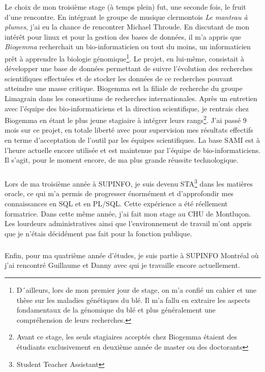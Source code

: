 \documentclass[11pt, a4paper ]{article}
\begin{document}
\begin{spacing}{1.5}
Le choix de mon troisième stage (à temps plein) fut, une seconde fois, le fruit d'une rencontre. En intégrant le groupe de musique clermontois \emph{Le manteau à plumes}, j'ai eu la chance de rencontrer Michael Throude. En discutant de mon intérêt pour linux et pour la gestion des bases de données, il m'a appris que \emph{Biogemma} recherchait un bio-informaticien ou tout du moins, un informaticien prêt à apprendre la biologie génomique\footnote{D´ailleurs, lors de mon premier jour de stage, on m'a confié un cahier et une thèse sur les maladies génétiques du blé. Il m'a fallu en extraire les aspects fondamentaux de la génomique du blé et plus généralement une compréhension de leurs recherches.}. Le projet, en lui-même, consistait à développer une base de données permettant de suivre l'évolution des recherches scientifiques effectuées et de stocker les données de ce recherches pouvant atteindre une masse critique. Biogemma est la filiale de recherche du groupe Limagrain dans les consortiums de recherches internationales. Après un entretien avec l'équipe des bio-informaticiens et la direction scientifique, je rentrais chez Biogemma en étant le plus jeune stagiaire à intégrer leurs rangs\footnote{Avant ce stage, les seuls stagiaires acceptés chez Biogemma étaient des étudiants exclusivement en deuxième année de master ou des doctorants}. J'ai passé 9 mois sur ce projet, en totale liberté avec pour supervision mes résultats effectifs en terme d'acceptation de l’outil par les équipes scientifiques. La base SAMI est à l'heure actuelle encore utilisée et est maintenue par l'équipe de bio-informaticiens. Il s'agit, pour le moment encore, de ma plus grande réussite technologique.
\subparagraph{}
Lors de ma troisième année à SUPINFO, je suis devenu STA\footnote{Student Teacher Assistant} dans les matières oracle, ce qui m'a permis de progresser énormément et d’approfondir mes connaissances en SQL et en PL/SQL. Cette expérience a été réellement formatrice.
Dans cette même année, j'ai fait mon stage au CHU de Montluçon. Les lourdeurs administratives ainsi que l'environnement de travail m'ont appris que je n'étais décidément pas fait pour la fonction publique.
\subparagraph{}
Enfin, pour ma quatrième année d'études, je suis partie à SUPINFO Montréal où j'ai rencontré Guillaume et Danny avec qui je travaille encore actuellement.



\end{spacing}
\end{document}
